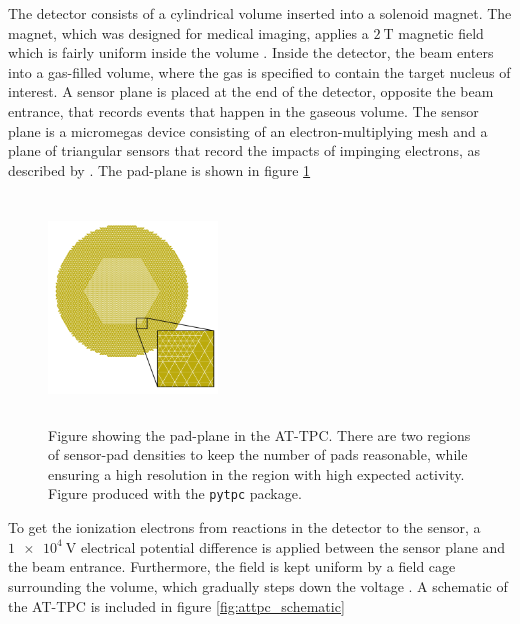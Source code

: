  The detector consists of a cylindrical volume inserted into a solenoid magnet. The magnet, which was designed for medical imaging, applies a $\SI{2}{\tesla}$ magnetic field which is fairly uniform inside the volume \cite{Bradt2017a}. Inside the detector, the beam enters into a gas-filled volume, where the gas is specified to contain the target nucleus of interest. A sensor plane is placed at the end of the detector, opposite the beam entrance, that records events that happen in the gaseous volume. The sensor plane is a micromegas device consisting of an electron-multiplying mesh and a plane of triangular sensors that record the impacts of impinging electrons, as described by \citet{Giomataris1996}. The pad-plane is shown in figure \ref{fig:attpc_padplane}

 \begin{figure}
\centering
\includegraphics[width=0.4\textwidth, height=6cm]{../plots/at_tpc_padplane}
\caption[AT-TPC pad plane]{Figure showing the pad-plane in the AT-TPC. There are two regions of sensor-pad densities to keep the number of pads reasonable, while ensuring a high resolution in the region with high expected activity. Figure produced with the \lstinline{pytpc} package.}\label{fig:attpc_padplane}
 \end{figure}

 To get the ionization electrons from reactions in the detector to the sensor, a $\SI{1e4}{\volt}$ electrical potential difference is applied between the sensor plane and the beam entrance. Furthermore, the field is kept uniform by a field cage surrounding the volume, which gradually steps down the voltage \cite{Bradt2017a}. A schematic of the AT-TPC is included in figure \ref{fig:attpc_schematic}

